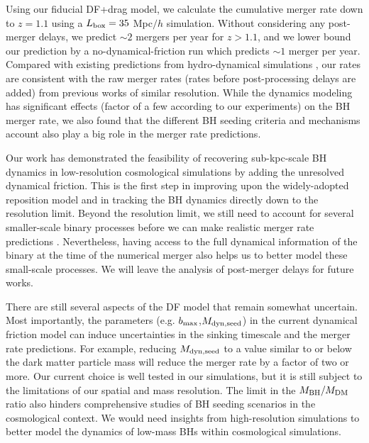 Using our fiducial DF+drag model, we calculate the cumulative merger rate down to $z=1.1$ using a $L_{\rm box}=35$ Mpc$/h$ simulation. Without considering any post-merger delays, we predict $\sim 2$ mergers per year for $z>1.1$, and we lower bound our prediction by a no-dynamical-friction run which predicts $\sim 1$ merger per year. 
Compared with existing predictions from hydro-dynamical simulations \citep[][]{Salcido2016,Katz2020,Volonteri2020}, our rates are consistent with the raw merger rates (rates before post-processing delays are added) from previous works of similar resolution. 
While the dynamics modeling has significant effects (factor of a few according to our experiments) on the BH merger rate, we also found that the different BH seeding criteria and mechanisms account also play a big role in the merger rate predictions.

 Our work has demonstrated the feasibility of recovering sub-kpc-scale BH dynamics in low-resolution cosmological simulations by adding the unresolved dynamical friction. This is the first step in improving upon the widely-adopted reposition model and in tracking the BH dynamics directly down to the resolution limit. Beyond the resolution limit, we still need to account for several smaller-scale binary processes before we can make realistic merger rate predictions \citep[e.g.][]{Quinlan1996,Sesana2007b,Haiman2009,Vasiliev2015,Dosopoulou2017,Bonetti2018,Kelley2017,Katz2020}. Nevertheless, having access to the full dynamical information of the binary at the time of the numerical merger also helps us to better model these small-scale processes. We will leave the analysis of post-merger delays for future works.

There are still several aspects of the DF model that remain somewhat uncertain. Most importantly, the parameters (e.g. $b_{\rm max}$,$M_{\rm dyn,seed}$) in the current dynamical friction model can induce uncertainties in the sinking timescale and the merger rate predictions. For example, reducing $M_{\rm dyn,seed}$ to a value similar to or below the dark matter particle mass will reduce the merger rate by a factor of two or more. Our current choice is well tested in our simulations, but it is still subject to the limitations of our spatial and mass resolution. The limit in the $M_{\rm BH}/M_{\rm DM}$ ratio also hinders comprehensive studies of BH seeding scenarios in the cosmological context. We would need insights from high-resolution simulations \citep[e.g.][]{Dosopoulou2017,Pfister2019} to better model the dynamics of low-mass BHs within cosmological simulations. 

